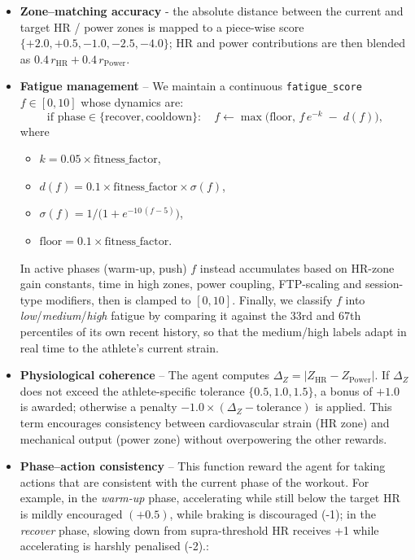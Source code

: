 \begin{itemize}
  
  \item \textbf{Zone–matching accuracy} - the absolute distance between the current and target HR / power zones is mapped to a piece-wise score \(\{+2.0,+0.5,-1.0,-2.5,-4.0\}\); HR and power contributions are then blended as \(0.4\,r_{\text{HR}} + 0.4\,r_{\text{Power}}\).

    \item \textbf{Fatigue management} – We maintain a continuous \verb|fatigue_score| \(f\in[0,10]\) whose dynamics are:
  \[
    \text{if phase}\in\{\text{recover},\text{cooldown}\}:\quad
      f \leftarrow \max\bigl(\mathrm{floor},\,f\,e^{-k}\;-\;d(f)\bigr),
  \]
  where
  \begin{itemize}
    \item \(k = 0.05 \times \text{fitness\_factor}\),
    \item \(d(f) = 0.1 \times \text{fitness\_factor}\times \sigma(f)\),
    \item \(\sigma(f) = 1/\bigl(1 + e^{-10\,(f-5)}\bigr)\),
    \item \(\mathrm{floor} = 0.1 \times \text{fitness\_factor}\).
  \end{itemize}
  In active phases (warm-up, push) \(f\) instead accumulates based on HR-zone gain constants, time in high zones, power coupling, FTP-scaling and session-type modifiers, then is clamped to \([0,10]\).  
  Finally, we classify \(f\) into \emph{low}/\emph{medium}/\emph{high} fatigue by comparing it against the 33rd and 67th percentiles of its own recent history, so that the medium/high labels adapt in real time to the athlete’s current strain.


  \item \textbf{Physiological coherence} – The agent computes \(\Delta_Z=\lvert Z_{\text{HR}}-Z_{\text{Power}}\rvert\). If \(\Delta_Z\) does not exceed the athlete-specific tolerance \(\{0.5,1.0,1.5\}\), a bonus of \(+1.0\) is awarded; otherwise a penalty \(-1.0\times(\Delta_Z-\text{tolerance})\) is applied.  This term encourages consistency between cardiovascular strain (HR zone) and mechanical output (power zone) without overpowering the other rewards.

  \item \textbf{Phase–action consistency} – This function reward the agent for taking actions that are consistent with the current phase of the workout.  For example, in the \emph{warm-up} phase, accelerating while still below the target HR is mildly encouraged \((+0.5)\), while braking is discouraged (-1); in the \emph{recover} phase, slowing down from supra-threshold HR receives +1 while accelerating is harshly penalised (-2).:


\end{itemize}
